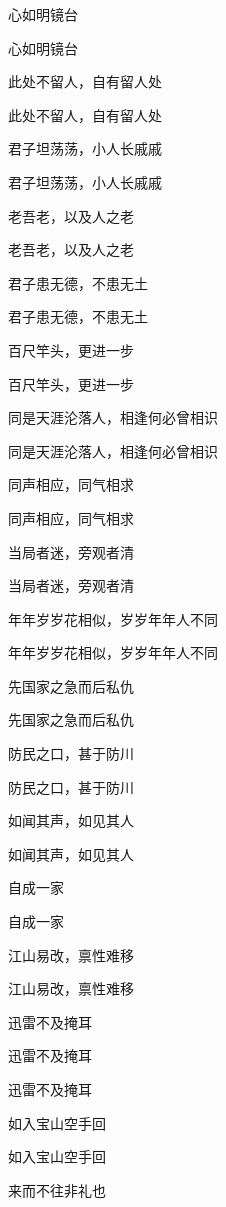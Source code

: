 \documentclass[12pt, a4paper, addpoints]{exam}
\begin{document}
\begin{multicols}{2}
\begin{questions}
\question[2] 心如明镜台

\question[2] 心如明镜台

\question[2] 此处不留人，自有留人处

\question[2] 此处不留人，自有留人处

\question[2] 君子坦荡荡，小人长戚戚

\question[2] 君子坦荡荡，小人长戚戚

\question[2] 老吾老，以及人之老

\question[2] 老吾老，以及人之老

\question[2] 君子患无德，不患无土

\question[2] 君子患无德，不患无土

\question[2] 百尺竿头，更进一步

\question[2] 百尺竿头，更进一步

\question[2] 同是天涯沦落人，相逢何必曾相识

\question[2] 同是天涯沦落人，相逢何必曾相识

\question[2] 同声相应，同气相求

\question[2] 同声相应，同气相求

\question[2] 当局者迷，旁观者清

\question[2] 当局者迷，旁观者清

\question[2] 年年岁岁花相似，岁岁年年人不同

\question[2] 年年岁岁花相似，岁岁年年人不同

\question[2] 先国家之急而后私仇

\question[2] 先国家之急而后私仇

\question[2] 防民之口，甚于防川

\question[2] 防民之口，甚于防川

\question[2] 如闻其声，如见其人

\question[2] 如闻其声，如见其人

\question[2] 自成一家

\question[2] 自成一家

\question[2] 江山易改，禀性难移

\question[2] 江山易改，禀性难移

\question[2] 迅雷不及掩耳

\question[2] 迅雷不及掩耳

\question[2] 迅雷不及掩耳

\question[2] 如入宝山空手回

\question[2] 如入宝山空手回

\question[2] 来而不往非礼也


\end{questions}
\end{multicols}
\end{document}
